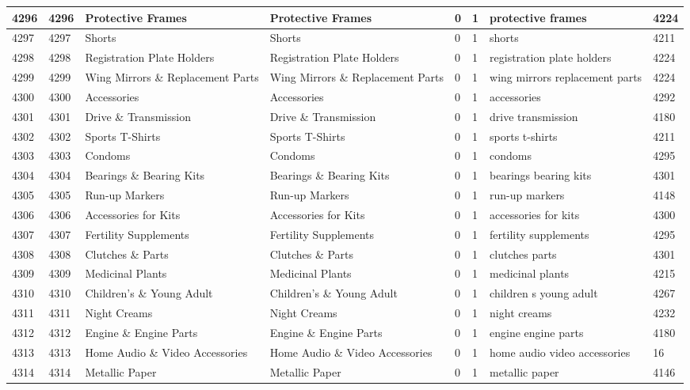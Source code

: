 \begin{longtable}{|l|l|l|l|l|l|l|l|}
4296 & 4296 & Protective Frames & Protective Frames & 0 & 1 & protective frames & 4224 \\ \hline 
4297 & 4297 & Shorts & Shorts & 0 & 1 & shorts & 4211 \\ \hline 
4298 & 4298 & Registration Plate Holders & Registration Plate Holders & 0 & 1 & registration plate holders & 4224 \\ \hline 
4299 & 4299 & Wing Mirrors \& Replacement Parts & Wing Mirrors \& Replacement Parts & 0 & 1 & wing mirrors replacement parts & 4224 \\ \hline 
4300 & 4300 & Accessories & Accessories & 0 & 1 & accessories & 4292 \\ \hline 
4301 & 4301 & Drive \& Transmission & Drive \& Transmission & 0 & 1 & drive transmission & 4180 \\ \hline 
4302 & 4302 & Sports T-Shirts & Sports T-Shirts & 0 & 1 & sports t-shirts & 4211 \\ \hline 
4303 & 4303 & Condoms & Condoms & 0 & 1 & condoms & 4295 \\ \hline 
4304 & 4304 & Bearings \& Bearing Kits & Bearings \& Bearing Kits & 0 & 1 & bearings bearing kits & 4301 \\ \hline 
4305 & 4305 & Run-up Markers & Run-up Markers & 0 & 1 & run-up markers & 4148 \\ \hline 
4306 & 4306 & Accessories for Kits & Accessories for Kits & 0 & 1 & accessories for kits & 4300 \\ \hline 
4307 & 4307 & Fertility Supplements & Fertility Supplements & 0 & 1 & fertility supplements & 4295 \\ \hline 
4308 & 4308 & Clutches \& Parts & Clutches \& Parts & 0 & 1 & clutches parts & 4301 \\ \hline 
4309 & 4309 & Medicinal Plants & Medicinal Plants & 0 & 1 & medicinal plants & 4215 \\ \hline 
4310 & 4310 & Children's \& Young Adult & Children's \& Young Adult & 0 & 1 & children s young adult & 4267 \\ \hline 
4311 & 4311 & Night Creams & Night Creams & 0 & 1 & night creams & 4232 \\ \hline 
4312 & 4312 & Engine \& Engine Parts & Engine \& Engine Parts & 0 & 1 & engine engine parts & 4180 \\ \hline 
4313 & 4313 & Home Audio \& Video Accessories & Home Audio \& Video Accessories & 0 & 1 & home audio video accessories & 16 \\ \hline 
4314 & 4314 & Metallic Paper & Metallic Paper & 0 & 1 & metallic paper & 4146 \\ \hline 

\end{longtable}
